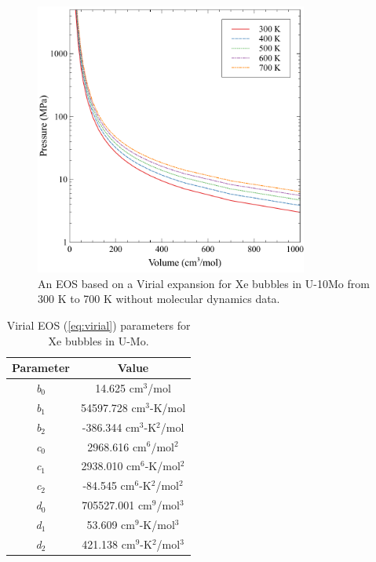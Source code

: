 \documentclass[review]{elsarticle}
\begin{document}
\begin{figure}[h!]
 \centering
 \includegraphics[width=0.8\textwidth]{virial_fit} 
 \caption{An EOS based on a Virial expansion for Xe bubbles in U-10Mo from 300 K to 700 K without molecular dynamics data. }
 \label{fig:Vir}
\end{figure}

\begin{table}[h!]
\caption{Virial EOS (\cref{eq:virial}) parameters for Xe bubbles in U-Mo.}
\label{tab:virial}
\begin{center}
\begin{tabular}{|c|c|}
     \hline
      Parameter & Value \\
     \hline
     \textit{b$_0$} & 14.625 cm$^3$/mol \\
     \textit{b$_1$} & 54597.728 cm$^3$-K/mol  \\
     \textit{b$_2$} & -386.344 cm$^3$-K$^2$/mol \\
     \textit{c$_0$} & 2968.616 cm$^6$/mol$^2$ \\
     \textit{c$_1$} & 2938.010 cm$^6$-K/mol$^2$  \\
     \textit{c$_2$} & -84.545 cm$^6$-K$^2$/mol$^2$ \\
     \textit{d$_0$} & 705527.001 cm$^9$/mol$^3$ \\
     \textit{d$_1$} & 53.609 cm$^9$-K/mol$^3$ \\
     \textit{d$_2$} & 421.138 cm$^9$-K$^2$/mol$^3$ \\
     \hline
\end{tabular}
\end{center}
\label{default}
\end{table}%
\end{document}
